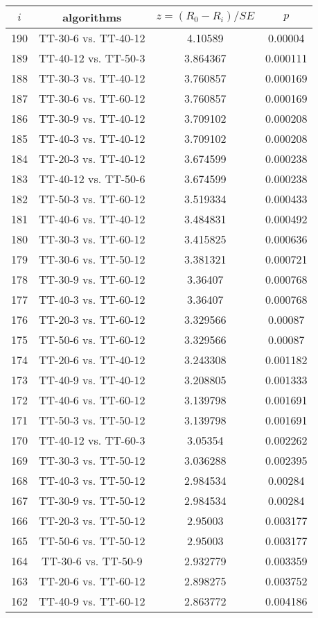 \documentclass[a4paper,10pt]{article}
\begin{document}
\begin{landscape}
\begin{table}[!htp]
\centering\scriptsize
\begin{tabular}{cccc}
$i$&algorithms&$z=(R_0 - R_i)/SE$&$p$\\
\hline190&TT-30-6 vs. TT-40-12&4.10589&0.00004\\
189&TT-40-12 vs. TT-50-3&3.864367&0.000111\\
188&TT-30-3 vs. TT-40-12&3.760857&0.000169\\
187&TT-30-6 vs. TT-60-12&3.760857&0.000169\\
186&TT-30-9 vs. TT-40-12&3.709102&0.000208\\
185&TT-40-3 vs. TT-40-12&3.709102&0.000208\\
184&TT-20-3 vs. TT-40-12&3.674599&0.000238\\
183&TT-40-12 vs. TT-50-6&3.674599&0.000238\\
182&TT-50-3 vs. TT-60-12&3.519334&0.000433\\
181&TT-40-6 vs. TT-40-12&3.484831&0.000492\\
180&TT-30-3 vs. TT-60-12&3.415825&0.000636\\
179&TT-30-6 vs. TT-50-12&3.381321&0.000721\\
178&TT-30-9 vs. TT-60-12&3.36407&0.000768\\
177&TT-40-3 vs. TT-60-12&3.36407&0.000768\\
176&TT-20-3 vs. TT-60-12&3.329566&0.00087\\
175&TT-50-6 vs. TT-60-12&3.329566&0.00087\\
174&TT-20-6 vs. TT-40-12&3.243308&0.001182\\
173&TT-40-9 vs. TT-40-12&3.208805&0.001333\\
172&TT-40-6 vs. TT-60-12&3.139798&0.001691\\
171&TT-50-3 vs. TT-50-12&3.139798&0.001691\\
170&TT-40-12 vs. TT-60-3&3.05354&0.002262\\
169&TT-30-3 vs. TT-50-12&3.036288&0.002395\\
168&TT-40-3 vs. TT-50-12&2.984534&0.00284\\
167&TT-30-9 vs. TT-50-12&2.984534&0.00284\\
166&TT-20-3 vs. TT-50-12&2.95003&0.003177\\
165&TT-50-6 vs. TT-50-12&2.95003&0.003177\\
164&TT-30-6 vs. TT-50-9&2.932779&0.003359\\
163&TT-20-6 vs. TT-60-12&2.898275&0.003752\\
162&TT-40-9 vs. TT-60-12&2.863772&0.004186\\

\end{tabular}
\end{table}
\end{landscape}
\end{document}
